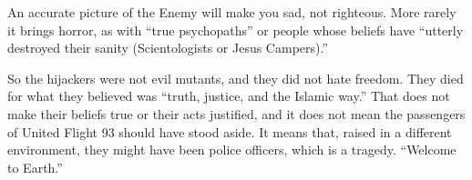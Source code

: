 An accurate picture of the Enemy will make you sad, not righteous. More rarely it brings horror, as with ``true psychopaths'' or people whose beliefs have ``utterly destroyed their sanity (Scientologists or Jesus Campers).'' 

So the hijackers were not evil mutants, and they did not hate freedom. They died for what they believed was ``truth, justice, and the Islamic way.''  That does not make their beliefs true or their acts justified, and it does not mean the passengers of United Flight 93 should have stood aside. It means that, raised in a different environment, they might have been police officers, which is a tragedy. ``Welcome to Earth.''

